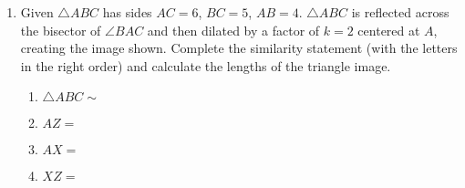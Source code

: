 \documentclass[12pt, twoside]{article}
\begin{document}
\begin{enumerate}
\newpage
\item Given $\triangle ABC$ has sides $AC = 6$, $BC = 5$, $AB = 4$. $\triangle ABC$ is reflected across the bisector of $\angle BAC$ and then dilated by a factor of $k=2$ centered at $A$, creating the image shown. Complete the similarity statement (with the letters in the right order) and calculate the lengths of the triangle image.
  \begin{multicols}{2}
    \begin{enumerate}
      \item $\triangle ABC \sim$ \vspace{0.3cm}
      \item $AZ=$ \vspace{0.3cm}
      \item $AX=$ \vspace{0.3cm}
      \item $XZ=$
    \end{enumerate}
        \begin{flushright}
      \end{flushright}
    \end{multicols} \vspace{1cm}
  

\end{enumerate}
\end{document}

